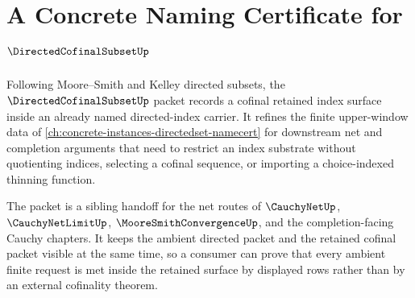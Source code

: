 \chapter{A Concrete Naming Certificate for $\DirectedCofinalSubsetUp$}
\label{ch:concrete-instances-directed-cofinal-subset-namecert}

Following Moore--Smith and Kelley directed subsets, the $\DirectedCofinalSubsetUp$ packet records a cofinal retained index surface inside an already named directed-index carrier. It refines the finite upper-window data of \autoref{ch:concrete-instances-directedset-namecert} for downstream net and completion arguments that need to restrict an index substrate without quotienting indices, selecting a cofinal sequence, or importing a choice-indexed thinning function.

The packet is a sibling handoff for the net routes of $\CauchyNetUp$, $\CauchyNetLimitUp$, $\MooreSmithConvergenceUp$, and the completion-facing Cauchy chapters. It keeps the ambient directed packet and the retained cofinal packet visible at the same time, so a consumer can prove that every ambient finite request is met inside the retained surface by displayed rows rather than by an external cofinality theorem.

